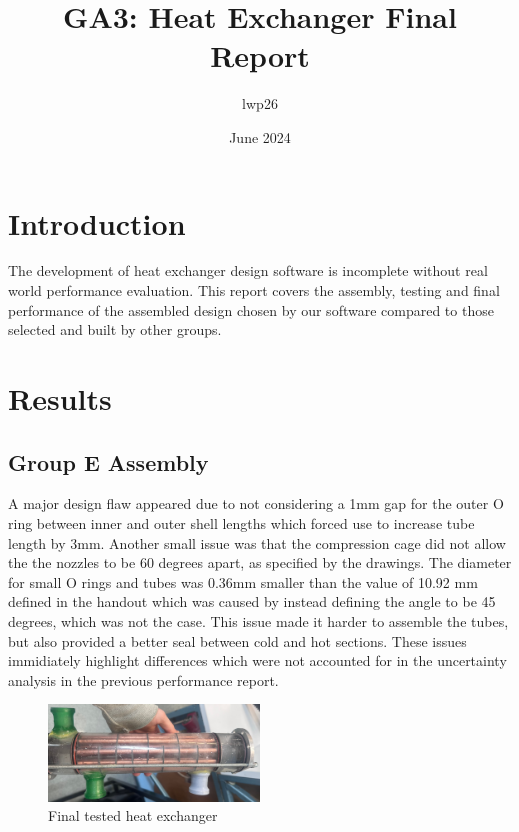 \documentclass{article}
\begin{document}
\title{GA3: Heat Exchanger Final Report}
\author{lwp26}
\date{June 2024}
\maketitle 


\section{Introduction}

The development of heat exchanger design software is incomplete without real world performance evaluation.
This report covers the assembly, testing and final performance of the assembled design chosen by our software compared to those selected and built by other groups.

\section{Results}

\subsection{Group E Assembly}
A major design flaw appeared due to not considering a 1mm gap for the outer O ring between inner and outer shell lengths which forced use to increase tube length by 3mm.
Another small issue was that the compression cage did not allow the the nozzles to be 60 degrees apart, as specified by the drawings.
The diameter for small O rings and tubes was 0.36mm smaller than the value of 10.92 mm defined in the handout which was caused by instead defining the angle to be 45 degrees, which was not the case.
This issue made it harder to assemble the tubes, but also provided a better seal between cold and hot sections.
These issues immidiately highlight differences which were not accounted for in the uncertainty analysis in the previous performance report.

\begin{figure}[H]
    \centering
    \includegraphics[width=0.5\textwidth]{final_tested.jpg}
    \caption{Final tested heat exchanger}
    \label{fig:heat_exchanger}
\end{figure}
\end{document}
